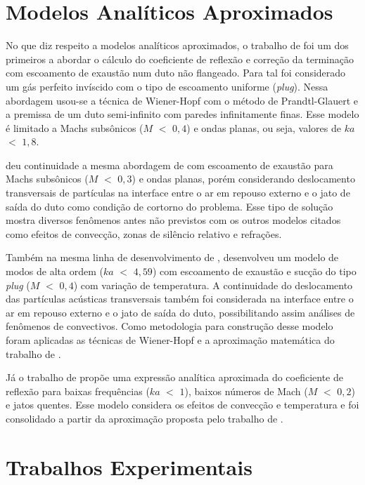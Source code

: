 \section{Modelos Analíticos Aproximados}

No que diz respeito a modelos analíticos aproximados, o trabalho de  foi um dos primeiros a abordar o cálculo do coeficiente de reflexão e correção da terminação com escoamento de exaustão num duto não flangeado. Para tal foi considerado um gás perfeito invíscido com o tipo de escoamento uniforme (\textit{plug}). Nessa abordagem usou-se a técnica de Wiener-Hopf com o método de Prandtl-Glauert e a premissa de um duto semi-infinito com paredes infinitamente finas. Esse modelo é limitado a Machs subsônicos ($M$ $<$ $0,4$) e ondas planas, ou seja, valores de $ka$ $<$ $1,8$.

 deu continuidade a mesma abordagem de  com escoamento de exaustão para Machs subsônicos ($M$ $<$ $0,3$) e ondas planas, porém considerando deslocamento transversais de partículas na interface entre o ar em repouso externo e o jato de saída do duto como condição de cortorno do problema. Esse tipo de solução mostra diversos fenômenos antes não previstos com os outros modelos citados como efeitos de convecção, zonas de silêncio relativo e refrações.

Também na mesma linha de desenvolvimento de ,  desenvolveu um modelo de modos de alta ordem ($ka$ $<$ $4,59$) com escoamento de exaustão e sucção do tipo \textit{plug} ($M$ $<$ $0,4$) com variação de temperatura. A continuidade do deslocamento das partículas acústicas transversais também foi considerada na interface entre o ar em repouso externo e o jato de saída do duto, possibilitando assim análises de fenômenos de convectivos. Como metodologia para construção desse modelo foram aplicadas as técnicas de Wiener-Hopf e a aproximação matemática do trabalho de .

Já o trabalho de  propõe uma expressão analítica aproximada do coeficiente de reflexão para baixas frequências ($ka$ $<$ $1$), baixos números de Mach ($M$ $<$ $0,2$) e jatos quentes. Esse modelo considera os efeitos de convecção e temperatura e foi consolidado a partir da aproximação proposta pelo trabalho de .   

\section{Trabalhos Experimentais}

